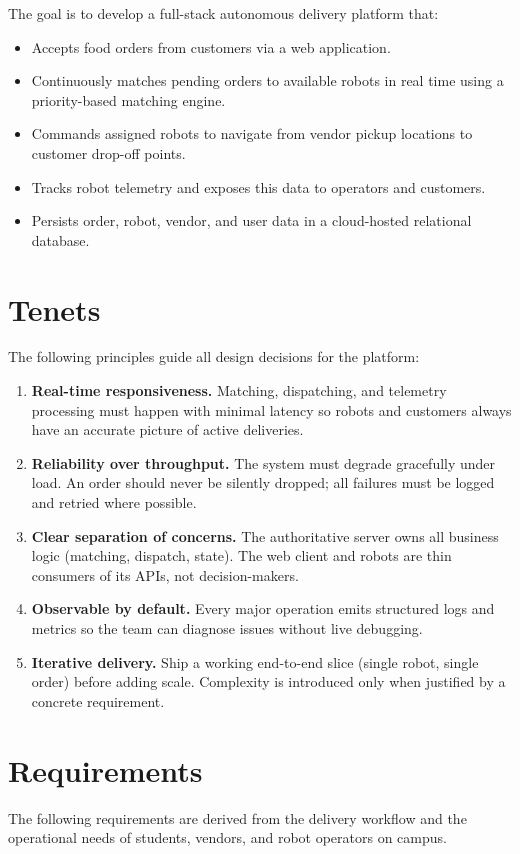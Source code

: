 \documentclass[12pt,a4paper]{article}
\begin{document}
The goal is to develop a full-stack autonomous delivery platform that:
\begin{itemize}
  \item Accepts food orders from customers via a web application.
  \item Continuously matches pending orders to available robots in real time using a priority-based matching engine.
  \item Commands assigned robots to navigate from vendor pickup locations to customer drop-off points.
  \item Tracks robot telemetry and exposes this data to operators and customers.
  \item Persists order, robot, vendor, and user data in a cloud-hosted relational database.
\end{itemize}
\newpage
\section{Tenets}
The following principles guide all design decisions for the platform:
\begin{enumerate}
  \item \textbf{Real-time responsiveness.} Matching, dispatching, and telemetry processing must happen with minimal latency so robots and customers always have an accurate picture of active deliveries.
  \item \textbf{Reliability over throughput.} The system must degrade gracefully under load. An order should never be silently dropped; all failures must be logged and retried where possible.
  \item \textbf{Clear separation of concerns.} The authoritative server owns all business logic (matching, dispatch, state). The web client and robots are thin consumers of its APIs, not decision-makers.
  \item \textbf{Observable by default.} Every major operation emits structured logs and metrics so the team can diagnose issues without live debugging.
  \item \textbf{Iterative delivery.} Ship a working end-to-end slice (single robot, single order) before adding scale. Complexity is introduced only when justified by a concrete requirement.
\end{enumerate}
\newpage
\section{Requirements}
The following requirements are derived from the delivery workflow and the operational needs of students, vendors, and robot operators on campus.
\end{document}
